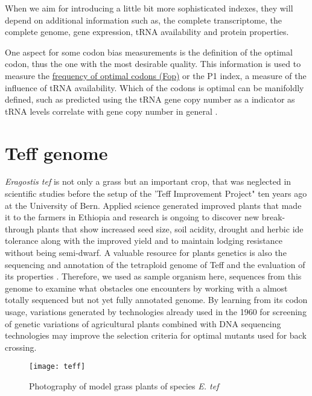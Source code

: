 When we aim for introducing a little bit more sophisticated indexes, they will depend on additional information such as, the complete transcriptome, the complete genome, gene expression, tRNA availability and protein properties.

One aspect for some codon bias measurements is the definition of the optimal codon, thus the one with the most desirable quality. This information is used to measure the \hyperlink{function:Fop}{frequency of optimal codons (Fop)} or the P1 index, a measure of the influence of tRNA availability. Which of the codons is optimal can be manifoldly defined, such as predicted using the tRNA gene copy number as a indicator as tRNA levels correlate with gene copy number in general \cite{Chaney2015}. %

\section{Teff genome}
\textit{Eragostis tef} is not only a grass but an important crop, that was neglected in scientific studies before the setup of the 'Teff Improvement Project" ten years ago at the University of Bern. Applied science generated improved plants that made it to the farmers in Ethiopia and research is ongoing to discover new break-through plants that show increased seed size, soil acidity, drought and herbic	ide tolerance along with the improved yield and to maintain lodging resistance without being semi-dwarf. A valuable resource for plants genetics is also the sequencing and annotation of the tetraploid genome of Teff and the evaluation of its properties \cite{cannarozzi2014genome}. Therefore, we used as sample organism here, sequences from this genome to examine what obstacles one encounters by working with a almost totally sequenced but not yet fully annotated genome. By learning from its codon usage, variations generated by technologies already used in the 1960 for screening of genetic variations of agricultural plants combined with DNA sequencing technologies may improve the selection criteria for optimal mutants used for back crossing. 

\begin{figure}[tb] 
\centering 
\texttt{[image: teff]} 
\caption[\textit{Eragostis tef} growing in culture room]{Photography of model grass plants of species \textit{E. tef}}
\label{fig:teff} 
\end{figure}


